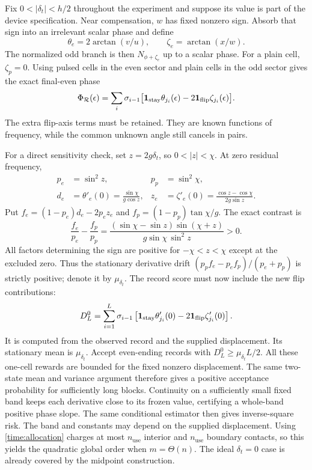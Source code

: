 \documentclass[11pt,a4paper]{article}
\numberwithin{equation}{section}
\theoremstyle{remark}
\begin{document}
Fix $0<|\delta_t|<h/2$ throughout the experiment and suppose its value is part
of the device specification. Near compensation, $w$ has fixed nonzero sign.
Absorb that sign into an irrelevant scalar phase and define
\begin{equation}
 \theta_e=2\arctan(v/u),\qquad
 \zeta_e=\arctan(x/w).
\end{equation}
The normalized odd branch is then $N_{\phi+\zeta_e}$ up to a scalar phase.
For a plain cell, $\zeta_p=0$. Using pulsed cells in the even sector and plain
cells in the odd sector gives the exact final-even phase
\begin{equation}
 \Phi_{\mathcal R}(\epsilon)=
 \sum_i\sigma_{i-1}\bigl[
  \mathbf1_{\rm stay}\theta_{j_i}(\epsilon)
  -2\mathbf1_{\rm flip}\zeta_{j_i}(\epsilon)\bigr].
 \label{time:knownphase}
\end{equation}
The extra flip-axis terms must be retained. They are known functions of
frequency, while the common unknown angle still cancels in pairs.

For a direct sensitivity check, set $z=2g\delta_t$, so $0<|z|<\chi$.
At zero residual frequency,
\begin{align}
 p_e&=\sin^2z,&p_p&=\sin^2\chi,\nonumber\\
 d_e&=\theta'_e(0)=\frac{\sin\chi}{g\cos z},&
 z_e&=\zeta'_e(0)=\frac{\cos z-\cos\chi}{2g\sin z}.
\end{align}
Put $f_e=(1-p_e)d_e-2p_ez_e$ and
$f_p=(1-p_p)\tan\chi/g$. The exact contrast is
\begin{equation}
 \frac{f_e}{p_e}-\frac{f_p}{p_p}
 =\frac{(\sin\chi-\sin z)\sin(\chi+z)}
 {g\sin\chi\,\sin^2z}>0.
\end{equation}
All factors determining the sign are positive for $-\chi<z<\chi$ except
at the excluded zero. Thus the stationary derivative drift
$(p_pf_e-p_ef_p)/(p_e+p_p)$ is strictly positive; denote it by $\mu_{\delta_t}$.
The record score must now include the new flip contributions:
\begin{equation}
 D_L^0=\sum_{i=1}^L\sigma_{i-1}
 \left[\mathbf1_{\rm stay}\theta'_{j_i}(0)
       -2\mathbf1_{\rm flip}\zeta'_{j_i}(0)\right].
\end{equation}
It is computed from the observed record and the supplied displacement.
Its stationary mean is $\mu_{\delta_t}$. Accept even-ending records with
$D_L^0\ge\mu_{\delta_t} L/2$. All these one-cell rewards are bounded for the
fixed nonzero displacement. The same two-state mean and variance argument
therefore gives a positive acceptance probability for sufficiently long
blocks. Continuity on a sufficiently small fixed band keeps each derivative
close to its frozen value, certifying a whole-band positive phase slope.
The same conditional estimator then gives inverse-square risk.
The band and constants may depend on the supplied displacement.
Using \eqref{time:allocation} charges at most $n_{\mathrm{use}}$ interior and $n_{\mathrm{use}}$ boundary
contacts, so this yields the quadratic global order when $m=\Theta(n)$.
The ideal $\delta_t=0$ case is already covered by the midpoint construction.
\end{document}
